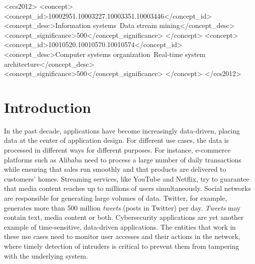 \documentclass[sigconf]{acmart}
\begin{document}
%
%
\begin{CCSXML}
<ccs2012>
   <concept>
       <concept_id>10002951.10003227.10003351.10003446</concept_id>
       <concept_desc>Information systems~Data stream mining</concept_desc>
       <concept_significance>500</concept_significance>
       </concept>
   <concept>
       <concept_id>10010520.10010570.10010574</concept_id>
       <concept_desc>Computer systems organization~Real-time system architecture</concept_desc>
       <concept_significance>500</concept_significance>
       </concept>
 </ccs2012>
\end{CCSXML}


%


%
\maketitle

\section{Introduction}
In the past decade, applications have become increasingly data-driven, placing data at the center of application design. For different use cases, the data is processed in different ways for different purposes. For instance, e-commerce platforms such as Alibaba need to process a large number of daily transactions while ensuring that sales run smoothly and that products are delivered to customers' homes. Streaming services, like YouTube and Netflix, try to guarantee that media content reaches up to millions of users simultaneously. Social networks are responsible for generating large volumes of data. Twitter, for example, generates more than 500 million \textit{tweets} (posts in Twitter) per day. \textit{Tweets} may contain text, media content or both. Cybersecurity applications are yet another example of time-sensitive, data-driven applications. The entities that work in these use cases need to monitor user accesses and their actions in the network, where timely detection of intruders is critical to prevent them from tampering with the underlying system.
\end{document}
